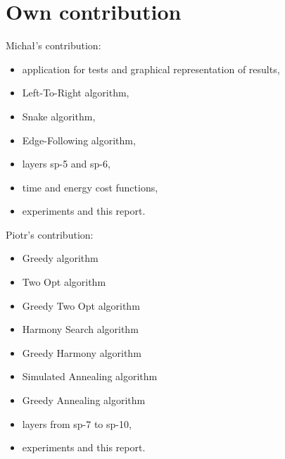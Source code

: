 \documentclass[titlepage]{article}
\begin{document}
\section{Own contribution}
Michał's contribution:
\begin{itemize}
\item application for tests and graphical representation of results,
\item Left-To-Right algorithm,
\item Snake algorithm,
\item Edge-Following algorithm,
\item layers sp-5 and sp-6,
\item time and energy cost functions,
\item experiments and this report.
\end{itemize}
Piotr's contribution:
\begin{itemize}
\item Greedy algorithm
\item Two Opt algorithm
\item Greedy Two Opt algorithm
\item Harmony Search algorithm
\item Greedy Harmony algorithm
\item Simulated Annealing algorithm
\item Greedy Annealing algorithm
\item layers from sp-7 to sp-10,
\item experiments and this report. 
\end{itemize}

\nocite{*}



\newpage


\end{document}
